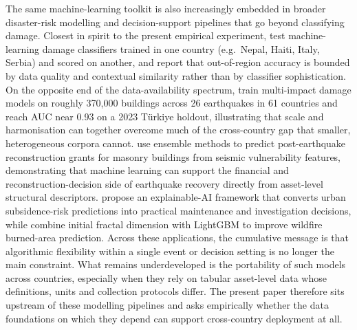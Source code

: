 \documentclass[11pt,a4paper]{article}
\begin{document}
The same machine-learning toolkit is also increasingly embedded in broader disaster-risk modelling and decision-support pipelines that go beyond classifying damage. Closest in spirit to the present empirical experiment, \citet{ghimire2024host} test machine-learning damage classifiers trained in one country (e.g.\ Nepal, Haiti, Italy, Serbia) and scored on another, and report that out-of-region accuracy is bounded by data quality and contextual similarity rather than by classifier sophistication. On the opposite end of the data-availability spectrum, \citet{patten2024datadriven} train multi-impact damage models on roughly 370{,}000 buildings across 26 earthquakes in 61 countries and reach AUC near 0.93 on a 2023 T\"urkiye holdout, illustrating that scale and harmonisation can together overcome much of the cross-country gap that smaller, heterogeneous corpora cannot.\citet{rosso2026grants} use ensemble methods to predict post-earthquake reconstruction grants for masonry buildings from seismic vulnerability features, demonstrating that machine learning can support the financial and reconstruction-decision side of earthquake recovery directly from asset-level structural descriptors. \citet{lee2026subsidence} propose an explainable-AI framework that converts urban subsidence-risk predictions into practical maintenance and investigation decisions, while \citet{kim2026wildfireifd} combine initial fractal dimension with LightGBM to improve wildfire burned-area prediction. Across these applications, the cumulative message is that algorithmic flexibility within a single event or decision setting is no longer the main constraint. What remains underdeveloped is the portability of such models across countries, especially when they rely on tabular asset-level data whose definitions, units and collection protocols differ. The present paper therefore sits upstream of these modelling pipelines and asks empirically whether the data foundations on which they depend can support cross-country deployment at all.
\end{document}
